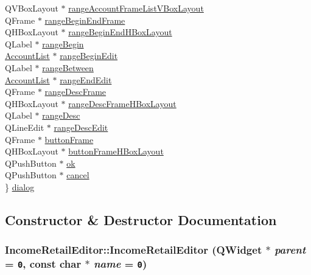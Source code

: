 \begin{CompactItemize}
\begin{tabbing}
\>QVBoxLayout $\ast$ \hyperlink{classIncomeRetailEditor_r18}{rangeAccountFrameListVBoxLayout}\\
\>QFrame $\ast$ \hyperlink{classIncomeRetailEditor_r19}{rangeBeginEndFrame}\\
\>QHBoxLayout $\ast$ \hyperlink{classIncomeRetailEditor_r20}{rangeBeginEndHBoxLayout}\\
\>QLabel $\ast$ \hyperlink{classIncomeRetailEditor_r21}{rangeBegin}\\
\>\hyperlink{classAccountList}{AccountList} $\ast$ \hyperlink{classIncomeRetailEditor_r22}{rangeBeginEdit}\\
\>QLabel $\ast$ \hyperlink{classIncomeRetailEditor_r23}{rangeBetween}\\
\>\hyperlink{classAccountList}{AccountList} $\ast$ \hyperlink{classIncomeRetailEditor_r24}{rangeEndEdit}\\
\>QFrame $\ast$ \hyperlink{classIncomeRetailEditor_r25}{rangeDescFrame}\\
\>QHBoxLayout $\ast$ \hyperlink{classIncomeRetailEditor_r26}{rangeDescFrameHBoxLayout}\\
\>QLabel $\ast$ \hyperlink{classIncomeRetailEditor_r27}{rangeDesc}\\
\>QLineEdit $\ast$ \hyperlink{classIncomeRetailEditor_r28}{rangeDescEdit}\\
\>QFrame $\ast$ \hyperlink{classIncomeRetailEditor_r29}{buttonFrame}\\
\>QHBoxLayout $\ast$ \hyperlink{classIncomeRetailEditor_r30}{buttonFrameHBoxLayout}\\
\>QPushButton $\ast$ \hyperlink{classIncomeRetailEditor_r31}{ok}\\
\>QPushButton $\ast$ \hyperlink{classIncomeRetailEditor_r32}{cancel}\\
\} \hyperlink{classIncomeRetailEditor_r33}{dialog}\\

\end{tabbing}\end{CompactItemize}


\subsection{Constructor \& Destructor Documentation}
\hypertarget{classIncomeRetailEditor_a0}{
\subsubsection[IncomeRetailEditor]{\setlength{\rightskip}{0pt plus 5cm}Income\-Retail\-Editor::Income\-Retail\-Editor (QWidget $\ast$ {\em parent} = {\tt 0}, const char $\ast$ {\em name} = {\tt 0})}}
\label{classIncomeRetailEditor_a0}


